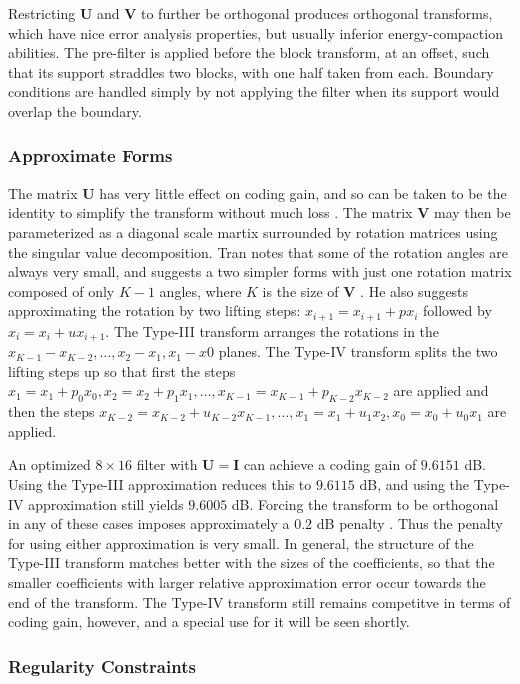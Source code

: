 \documentclass[11pt,letterpaper]{article}
\begin{document}
Restricting ${\mathbf U}$ and ${\mathbf V}$ to further be orthogonal produces
 orthogonal transforms, which have nice error analysis properties, but usually
 inferior energy-compaction abilities.
The pre-filter is applied before the block transform, at an offset, such that
 its support straddles two blocks, with one half taken from each.
Boundary conditions are handled simply by not applying the filter when its
 support would overlap the boundary.

\subsubsection{Approximate Forms}

The matrix ${\mathbf U}$ has very little effect on coding gain, and so can be
 taken to be the identity to simplify the transform without much loss
 \cite{Tra01a}.
The matrix ${\mathbf V}$ may then be parameterized as a diagonal scale martix
 surrounded by rotation matrices using the singular value decomposition.
Tran notes that some of the rotation angles are always very small, and suggests a
 two simpler forms with just one rotation matrix composed of only $K-1$ angles,
 where $K$ is the size of ${\mathbf V}$ \cite{Tra01a}.
He also suggests approximating the rotation by two lifting steps:
 $x_{i+1}=x_{i+1}+px_i$ followed by $x_i=x_i+ux_{i+1}$.
The Type-III transform arranges the rotations in the $x_{K-1}-x_{K-2},\ldots,
 x_2-x_1,x_1-x0$ planes.
The Type-IV transform splits the two lifting steps up so that first the steps
 $x_1=x_1+p_0x_0,x_2=x_2+p_1x_1,\ldots,x_{K-1}=x_{K-1}+p_{K-2}x_{K-2}$ are
 applied and then the steps $x_{K-2}=x_{K-2}+u_{K-2}x_{K-1},\ldots,
 x_1=x_1+u_1x_2,x_0=x_0+u_0x_1$ are applied.

An optimized $8\times 16$ filter with ${\mathbf U}={\mathbf I}$ can achieve a
 coding gain of $9.6151$ dB.
Using the Type-III approximation reduces this to $9.6115$ dB, and using the
 Type-IV approximation still yields $9.6005$ dB.
Forcing the transform to be orthogonal in any of these cases imposes
 approximately a $0.2$ dB penalty \cite{Tra01b}.
Thus the penalty for using either approximation is very small.
In general, the structure of the Type-III transform matches better with the
 sizes of the coefficients, so that the smaller coefficients with larger
 relative approximation error occur towards the end of the transform.
The Type-IV transform still remains competitve in terms of coding gain,
 however, and a special use for it will be seen shortly.

\subsubsection{Regularity Constraints}
\end{document}
